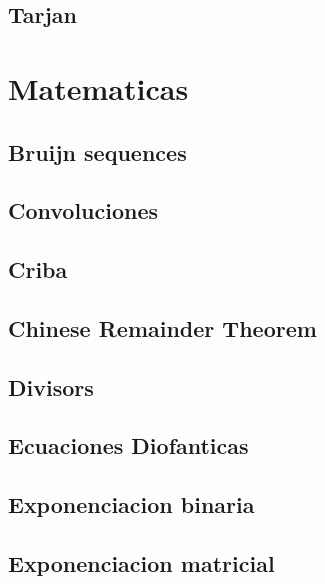 \subsection{Tarjan}
\raggedbottom
\hrulefill

\section{Matematicas}
\subsection{Bruijn sequences}
\raggedbottom
\hrulefill
\subsection{Convoluciones}
\raggedbottom
\hrulefill
\subsection{Criba}
\raggedbottom
\hrulefill
\subsection{Chinese Remainder Theorem}
\raggedbottom
\hrulefill
\subsection{Divisors}
\raggedbottom
\hrulefill
\subsection{Ecuaciones Diofanticas}
\raggedbottom
\hrulefill
\subsection{Exponenciacion binaria}
\raggedbottom
\hrulefill
\subsection{Exponenciacion matricial}
\raggedbottom
\hrulefill
